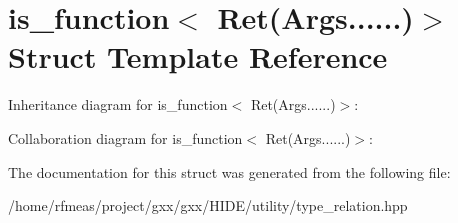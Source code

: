 \hypertarget{structis__function_3_01Ret_07Args_8_8_8_8_8_8_08_4}{}\section{is\+\_\+function$<$ Ret(Args......)$>$ Struct Template Reference}
\label{structis__function_3_01Ret_07Args_8_8_8_8_8_8_08_4}


Inheritance diagram for is\+\_\+function$<$ Ret(Args......)$>$\+:


Collaboration diagram for is\+\_\+function$<$ Ret(Args......)$>$\+:


The documentation for this struct was generated from the following file\+:\begin{DoxyCompactItemize}
\item 
/home/rfmeas/project/gxx/gxx/\+H\+I\+D\+E/utility/type\+\_\+relation.\+hpp\end{DoxyCompactItemize}
